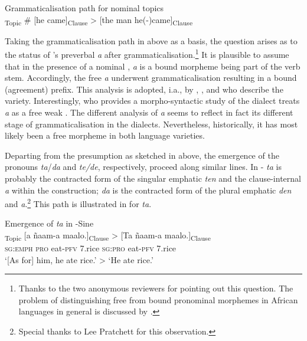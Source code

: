 \documentclass[output=paper
,newtxmath
,modfonts
,nonflat]{langsci/langscibook}
\begin{document}
\ea\label{ex:apel:13}
{Grammaticalisation path for nominal  topics \citep[adapted from][155]{Givon76}}\\
\textsubscript{Topic} \# [he came]\textsubscript{Clause} > [the man he(-)came]\textsubscript{Clause}
\z

Taking the grammaticalisation path in  above as a basis, the question arises as to the status of ’s preverbal \textit{a} after grammaticalisation.\footnote{Thanks to the two anonymous reviewers for pointing out this question. The problem of distinguishing free from bound pronominal morphemes in African languages in general is discussed by \citet{Creissels2005typology}.} It is plausible to assume that in the presence of a nominal , \textit{a} is a bound morpheme being part of the verb stem. Accordingly, the free  \textit{a} underwent grammaticalisation resulting in a bound (agreement) prefix. This analysis is adopted, i.a., by \citet{Renaudier2012}, \citet{Neely2013}, and \citet{Heath2014} who describe the  variety. Interestingly, \citet{Faye1979} who provides a morpho-syntactic study of the  dialect treats \textit{a} as a free weak  \citep[also][]{FayeMous06}. The different analysis of \textit{a} seems to reflect in fact its different stage of grammaticalisation in the dialects. Nevertheless, historically, it has most likely been a free morpheme in both language varieties.    

Departing from the presumption as sketched in  above, the emergence of the  pronouns \textit{ta}/\textit{da} and \textit{te/de}, respectively, proceed along similar lines. In - \textit{ta} is probably the contracted form of the singular emphatic  \textit{ten} and the clause-internal  \textit{a} within the  construction; \textit{da} is the contracted form of the plural emphatic  \textit{den} and \textit{a}.\footnote{Special thanks to Lee Pratchett for this observation.} This path is illustrated in  for \textit{ta}.

\ea\label{ex:apel:14}
{Emergence of \textit{ta} in -Sine}\\
\gll   [Ten]\textsubscript{Topic} [a ñaam-a maalo.]\textsubscript{Clause} > [Ta ñaam-a maalo.]\textsubscript{Clause}\\
     \textsc{sg:emph} \textsc{pro} eat\textsc{-pfv} \textsc{7.}rice {} \textsc{sg:pro} eat\textsc{-pfv} \textsc{7.}rice\\
\glt ‘[As for] him, he ate rice.’ > ‘He ate rice.’
\z
\end{document}
